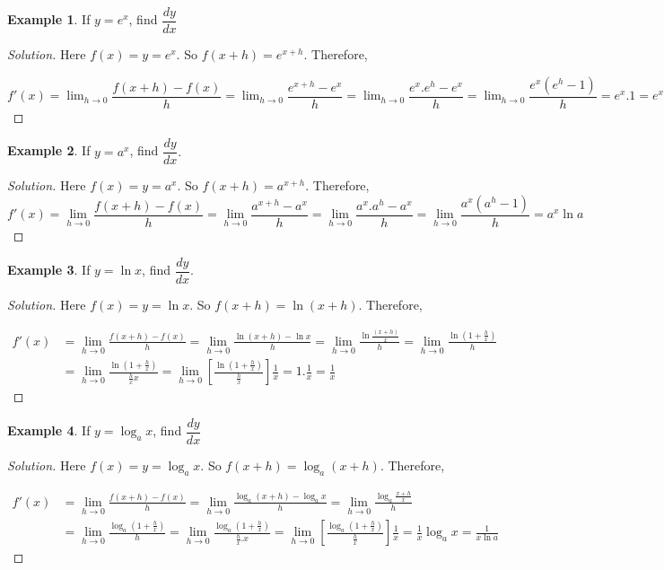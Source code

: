 \documentclass[../../main.tex]{subfiles}
\theoremstyle{definition}
\newtheorem{example}{Example}[section]
\newenvironment{solution}
    {\begin{proof}[Solution]}
    {\end{proof}}
\begin{document}
\begin{example}
If $y= e^x$, find $\dfrac{dy}{dx}$
\end{example}

\begin{solution}
Here $f(x)=y=e^x.$ So $f(x+h)=e^{x+h}.$ Therefore,

$f'(x) = \lim_{h \rightarrow 0} \dfrac {f(x+h)-f(x)}{h} =
\lim_{h \rightarrow 0} \dfrac {e^{x+h}-e^x}{h}=\lim_{h \rightarrow 0} \dfrac {e^x.e^h-e^x}{h}=\lim_{h \rightarrow 0} \dfrac {e^x(e^h-1)}{h}=e^x.1=e^x$
\end{solution}

\begin{example}
If $y= a^x$, find $\dfrac{dy}{dx}.$
\end{example}

\begin{solution}
Here $f(x)=y=a^x.$ So $f(x+h)=a^{x+h}$. Therefore, 
\[
f'(x) = \lim_{h \rightarrow 0} \frac {f(x+h)-f(x)}{h} = \lim_{h \rightarrow 0} \frac {a^{x+h}-a^x}{h} = \lim_{h \rightarrow 0} \frac {a^x.a^h-a^x}{h} = \lim_{h \rightarrow 0} \frac {a^x(a^h-1)}{h} = a^x\ln{a}
\]
\end{solution}

\begin{example}
If $y= \ln{x}$, find $\dfrac{dy}{dx}$.    
\end{example}

\begin{solution}
    Here $f(x)=y=\ln{x}.$ So $f(x+h)=\ln{(x+h)}$. Therefore,

\begin{align*}
    f'(x) &= \lim_{h \rightarrow 0} \frac {f(x+h)-f(x)}{h} = \lim_{h \rightarrow 0} \frac {\ln{(x+h)}-\ln{x}}{h} = \lim_{h \rightarrow 0} \frac {\ln{\frac{(x+h)}{x}}}{h} = \lim_{h \rightarrow 0} \frac {\ln{(1+\frac{h}{x})}}{h} \\ 
    &= \lim_{h \rightarrow 0} \frac {\ln{(1+\frac{h}{x})}}{\frac{h}{x}x} = \lim_{h \rightarrow 0} \left[\frac {\ln{(1+\frac{h}{x})}}{\frac{h}{x}}\right]\frac{1}{x} = 1.\frac{1}{x} = \frac{1}{x}
\end{align*}
\end{solution}

\begin{example}
If $y= \log_ax$, find $\dfrac{dy}{dx}$    
\end{example}

\begin{solution}
Here $f(x)=y=\log_a x.$ So $f(x+h)=\log_a (x+h).$ Therefore,

\begin{align*}
    f'(x) &= \lim_{h \rightarrow 0} \frac {f(x+h)-f(x)}{h} = \lim_{h \rightarrow 0} \frac {\log_a (x+h)-\log_a x}{h} = \lim_{h \rightarrow 0} \frac {\log_a \frac{x+h}{x}}{h} \\
    &= \lim_{h \rightarrow 0} \frac {\log_a {(1+\frac{h}{x})}}{h} = \lim_{h \rightarrow 0} \frac {\log_a {(1+\frac{h}{x})}}{\frac{h}{x}.x} = \lim_{h \rightarrow 0} \left[\frac {\log_a {(1+\frac{h}{x})}}{\frac{h}{x}}\right]\frac{1}{x} = \frac{1}{x}\log_a x = \frac{1}{x\ln{a}}
\end{align*}
\end{solution}
\end{document}
